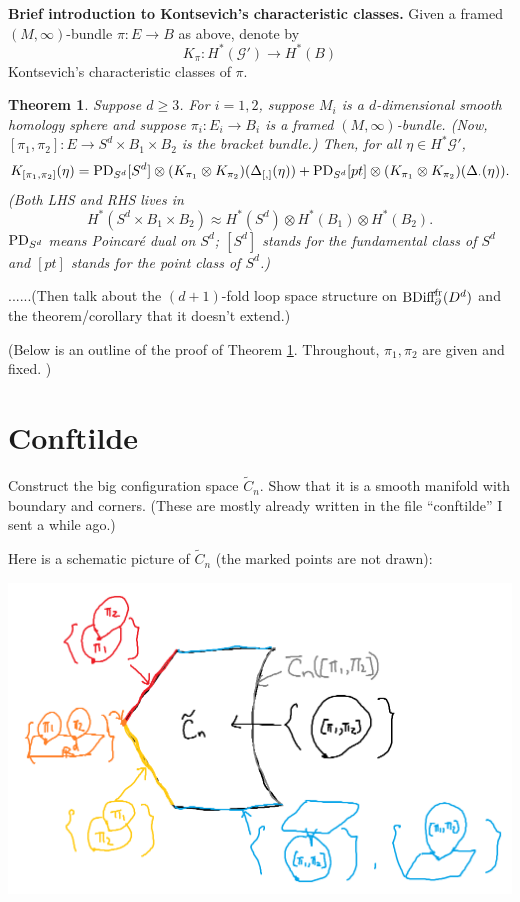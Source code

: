 \documentclass[11pt]{article}
\newtheorem{thm}{Theorem}[section]
\theoremstyle{definition}
\theoremstyle{remark}
\def\wt#1{\widetilde{#1}}
\def\cG{\mathcal{G}}
\def\tn#1{\textnormal{#1}}
\begin{document}
{\bf Brief introduction to Kontsevich's characteristic classes.}
Given a framed $(M,\infty)$-bundle $\pi:E\to B$ as above, denote by  
$$K_\pi: H^*(\cG')\longrightarrow H^*(B)$$
Kontsevich's characteristic classes of $\pi$. 


\begin{thm}\label{formula_thm}
Suppose $d\ge3$. 
For $i=1,2$, suppose $M_i$ is a $d$-dimensional smooth homology sphere and 
suppose $\pi_i: E_i\to B_i$ is a framed $(M,\infty)$-bundle. 
(Now, $[\pi_1,\pi_2]: E\to S^d\times B_1\times B_2$ is the bracket bundle.)
Then, for all $\eta\in H^*\cG'$, 
\begin{align*}
K_{[\pi_1,\pi_2]}(\eta)=
\tn{PD}_{S^d}[S^d]\otimes
(K_{\pi_1}\otimes K_{\pi_2})(\Delta_{[,]}(\eta))
+\tn{PD}_{S^d}[pt]\otimes
(K_{\pi_1}\otimes K_{\pi_2})(\Delta_\cdot(\eta)).
\end{align*}
(Both LHS and RHS lives in 
$$H^*(S^d\times B_1\times B_2)\approx H^*(S^d)\otimes H^*(B_1)\otimes H^*(B_2).$$
$\tn{PD}_{S^d}$ means Poincar\'e dual on $S^d$; $[S^d]$ stands for the fundamental class of $S^d$ and $[pt]$ stands for the point class of $S^d$.)
\end{thm}


......(Then talk about the $(d+1)$-fold loop space structure on $\tn{BDiff}^{\tn{fr}}_\partial(D^d)$ and the theorem/corollary that it doesn't extend.)

(Below is an outline of the proof of Theorem \ref{formula_thm}.
Throughout, $\pi_1,\pi_2$ are given and fixed. 
)

\section{Conftilde}

Construct the big configuration space $\widetilde{C}_n$. 
Show that it is a smooth manifold with boundary and corners. 
(These are mostly already written in the file ``conftilde'' I sent a while ago.)

Here is a schematic picture of $\wt{C}_n$ (the marked points are not drawn): 

\includegraphics[scale=0.7]{conftilde.png}
\end{document}

